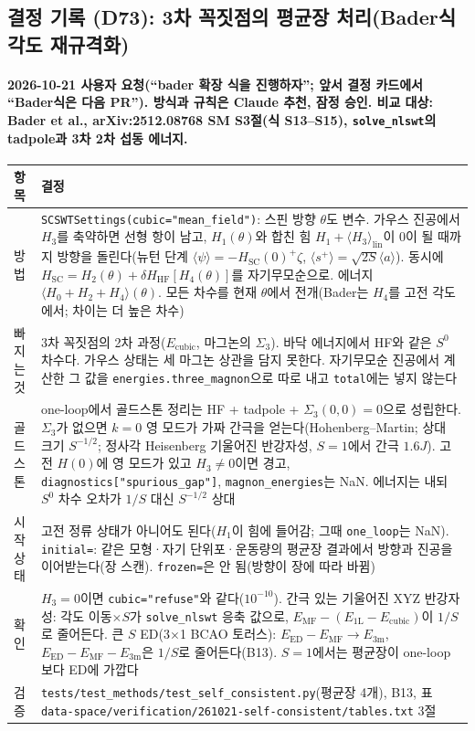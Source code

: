 \subsection{결정 기록 (D73): 3차 꼭짓점의 평균장 처리(Bader식 각도 재규격화)}\label{decisions-d73-mean-field-cubic}
\begingroup%
  \framesubtitle{2026-10-21 사용자 요청(``bader 확장 식을 진행하자''; 앞서 결정 카드에서 ``Bader식은 다음 PR''). 방식과 규칙은 Claude 추천, 잠정 승인. 비교 대상: Bader et al., arXiv:2512.08768 SM S3절(식 S13--S15), \texttt{solve\_nlswt}의 tadpole과 3차 2차 섭동 에너지.}
  \small\renewcommand{\arraystretch}{1.12}
  \begin{tabularx}{\textwidth}{@{}P{3.0cm}Y@{}}
    \toprule
    항목 & 결정 \\
    \midrule
    방법 & \texttt{SCSWTSettings(cubic="mean\_field")}: 스핀 방향 $\theta$도 변수. 가우스 진공에서 $H_3$를 축약하면 선형 항이 남고, $H_1(\theta)$와 합친 힘 $H_1+\langle H_3\rangle_\mathrm{lin}$이 0이 될 때까지 방향을 돌린다(뉴턴 단계 $\langle\psi\rangle=-H_\mathrm{SC}(0)^{+}\zeta$, $\langle s^+\rangle=\sqrt{2S}\langle a\rangle$). 동시에 $H_\mathrm{SC}=H_2(\theta)+\delta H_\mathrm{HF}[H_4(\theta)]$를 자기무모순으로. 에너지 $\langle H_0+H_2+H_4\rangle(\theta)$. 모든 차수를 현재 $\theta$에서 전개(Bader는 $H_4$를 고전 각도에서; 차이는 더 높은 차수) \\
    빠지는 것 & 3차 꼭짓점의 2차 과정($E_\mathrm{cubic}$, 마그논의 $\Sigma_3$). 바닥 에너지에서 HF와 같은 $S^0$ 차수다. 가우스 상태는 세 마그논 상관을 담지 못한다. 자기무모순 진공에서 계산한 그 값을 \texttt{energies.three\_magnon}으로 따로 내고 \texttt{total}에는 넣지 않는다 \\
    골드스톤 & one-loop에서 골드스톤 정리는 HF + tadpole + $\Sigma_3(0,0)=0$으로 성립한다. $\Sigma_3$가 없으면 $k=0$ 영 모드가 가짜 간극을 얻는다(Hohenberg--Martin; 상대 크기 $S^{-1/2}$; 정사각 Heisenberg 기울어진 반강자성, $S=1$에서 간극 $1.6J$). 고전 $H(0)$에 영 모드가 있고 $H_3\neq0$이면 경고, \texttt{diagnostics["spurious\_gap"]}, \texttt{magnon\_energies}는 NaN. 에너지는 내되 $S^0$ 차수 오차가 $1/S$ 대신 $S^{-1/2}$ 상대 \\
    시작 상태 & 고전 정류 상태가 아니어도 된다($H_1$이 힘에 들어감; 그때 \texttt{one\_loop}는 NaN). \texttt{initial=}: 같은 모형·자기 단위포·운동량의 평균장 결과에서 방향과 진공을 이어받는다(장 스캔). \texttt{frozen=}은 안 됨(방향이 장에 따라 바뀜) \\
    확인 & $H_3=0$이면 \texttt{cubic="refuse"}와 같다($10^{-10}$). 간극 있는 기울어진 XYZ 반강자성: 각도 이동$\times S$가 \texttt{solve\_nlswt} 응축 값으로, $E_\mathrm{MF}-(E_\mathrm{1L}-E_\mathrm{cubic})$이 $1/S$로 줄어든다. 큰 $S$ ED(3$\times$1 BCAO 토러스): $E_\mathrm{ED}-E_\mathrm{MF}\to E_\mathrm{3m}$, $E_\mathrm{ED}-E_\mathrm{MF}-E_\mathrm{3m}$은 $1/S$로 줄어든다(B13). $S=1$에서는 평균장이 one-loop보다 ED에 가깝다 \\
    검증 & \texttt{tests/test\_methods/test\_self\_consistent.py}(평균장 4개), B13, 표 \texttt{data-space/verification/261021-self-consistent/tables.txt} 3절 \\
    \bottomrule
  \end{tabularx}
\endgroup

